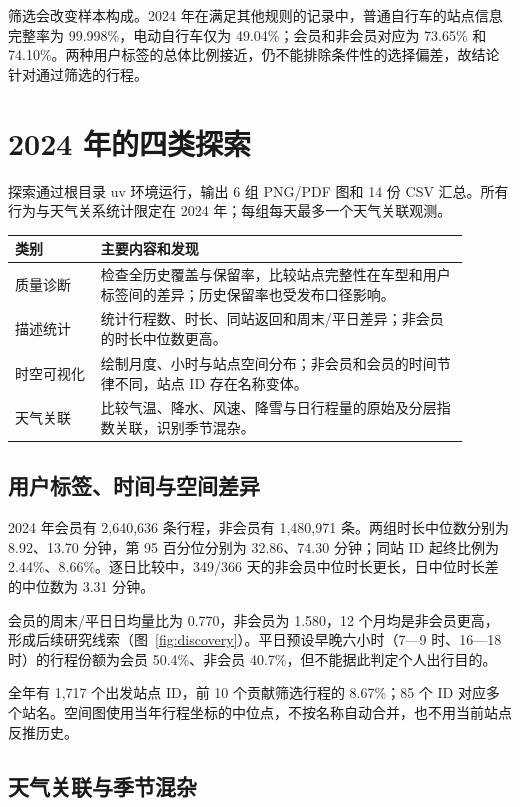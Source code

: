 \documentclass[UTF8,fontset=fandol,a4paper,zihao=-4]{ctexart}
\begin{document}
筛选会改变样本构成。2024 年在满足其他规则的记录中，普通自行车的站点信息完整率为 99.998\%，电动自行车仅为 49.04\%；会员和非会员对应为 73.65\% 和 74.10\%。两种用户标签的总体比例接近，仍不能排除条件性的选择偏差，故结论针对通过筛选的行程。

\section{2024 年的四类探索}

探索通过根目录 uv 环境运行，输出 6 组 PNG/PDF 图和 14 份 CSV 汇总。所有行为与天气关系统计限定在 2024 年；每组每天最多一个天气关联观测。

\begin{center}
\small
\begin{tabular}{p{0.17\linewidth}p{0.73\linewidth}}
\toprule
类别 & 主要内容和发现\\
\midrule
质量诊断 & 检查全历史覆盖与保留率，比较站点完整性在车型和用户标签间的差异；历史保留率也受发布口径影响。\\
描述统计 & 统计行程数、时长、同站返回和周末/平日差异；非会员的时长中位数更高。\\
时空可视化 & 绘制月度、小时与站点空间分布；非会员和会员的时间节律不同，站点 ID 存在名称变体。\\
天气关联 & 比较气温、降水、风速、降雪与日行程量的原始及分层指数关联，识别季节混杂。\\
\bottomrule
\end{tabular}
\end{center}

\subsection{用户标签、时间与空间差异}

2024 年会员有 2,640,636 条行程，非会员有 1,480,971 条。两组时长中位数分别为 8.92、13.70 分钟，第 95 百分位分别为 32.86、74.30 分钟；同站 ID 起终比例为 2.44\%、8.66\%。逐日比较中，349/366 天的非会员中位时长更长，日中位时长差的中位数为 3.31 分钟。

会员的周末/平日日均量比为 0.770，非会员为 1.580，12 个月均是非会员更高，形成后续研究线索（图~\ref{fig:discovery}）。平日预设早晚六小时（7—9 时、16—18 时）的行程份额为会员 50.4\%、非会员 40.7\%，但不能据此判定个人出行目的。

全年有 1,717 个出发站点 ID，前 10 个贡献筛选行程的 8.67\%；85 个 ID 对应多个站名。空间图使用当年行程坐标的中位点，不按名称自动合并，也不用当前站点反推历史。

\subsection{天气关联与季节混杂}
\end{document}

